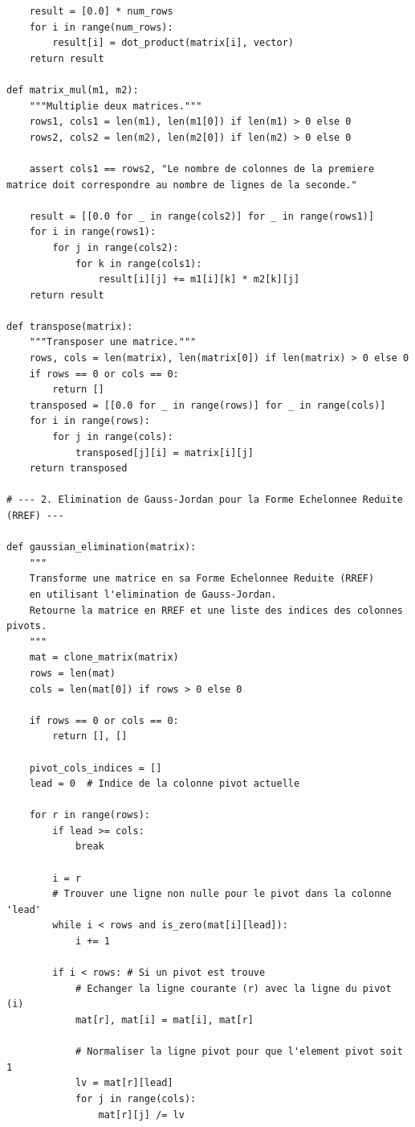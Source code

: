 \documentclass{report}
\begin{document}
\begin{verbatim}
    result = [0.0] * num_rows
    for i in range(num_rows):
        result[i] = dot_product(matrix[i], vector)
    return result

def matrix_mul(m1, m2):
    """Multiplie deux matrices."""
    rows1, cols1 = len(m1), len(m1[0]) if len(m1) > 0 else 0
    rows2, cols2 = len(m2), len(m2[0]) if len(m2) > 0 else 0

    assert cols1 == rows2, "Le nombre de colonnes de la premiere matrice doit correspondre au nombre de lignes de la seconde."

    result = [[0.0 for _ in range(cols2)] for _ in range(rows1)]
    for i in range(rows1):
        for j in range(cols2):
            for k in range(cols1):
                result[i][j] += m1[i][k] * m2[k][j]
    return result

def transpose(matrix):
    """Transposer une matrice."""
    rows, cols = len(matrix), len(matrix[0]) if len(matrix) > 0 else 0
    if rows == 0 or cols == 0:
        return []
    transposed = [[0.0 for _ in range(rows)] for _ in range(cols)]
    for i in range(rows):
        for j in range(cols):
            transposed[j][i] = matrix[i][j]
    return transposed

# --- 2. Elimination de Gauss-Jordan pour la Forme Echelonnee Reduite (RREF) ---

def gaussian_elimination(matrix):
    """
    Transforme une matrice en sa Forme Echelonnee Reduite (RREF)
    en utilisant l'elimination de Gauss-Jordan.
    Retourne la matrice en RREF et une liste des indices des colonnes pivots.
    """
    mat = clone_matrix(matrix)
    rows = len(mat)
    cols = len(mat[0]) if rows > 0 else 0

    if rows == 0 or cols == 0:
        return [], []

    pivot_cols_indices = []
    lead = 0  # Indice de la colonne pivot actuelle

    for r in range(rows):
        if lead >= cols:
            break

        i = r
        # Trouver une ligne non nulle pour le pivot dans la colonne 'lead'
        while i < rows and is_zero(mat[i][lead]):
            i += 1

        if i < rows: # Si un pivot est trouve
            # Echanger la ligne courante (r) avec la ligne du pivot (i)
            mat[r], mat[i] = mat[i], mat[r]

            # Normaliser la ligne pivot pour que l'element pivot soit 1
            lv = mat[r][lead]
            for j in range(cols):
                mat[r][j] /= lv


\end{verbatim}
\end{document}
